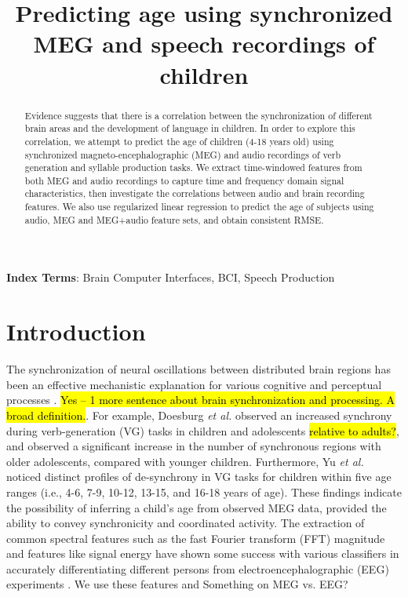 \documentclass[a4paper]{article}
\title{Predicting age using synchronized MEG and speech recordings of children}
\newcommand{\FR}[1]{{\small \textcolor{red}{\hl{#1}}}}
\begin{document}
\maketitle
% 
\begin{abstract}
Evidence suggests that there is a correlation between the synchronization of different brain areas and the development of language in children. In order to explore this correlation, we attempt to predict the age of children (4-18 years old) using synchronized magneto-encephalographic (MEG) and audio recordings of verb generation and syllable production tasks. We extract time-windowed features from both MEG and audio recordings to capture time and frequency domain signal characteristics, then investigate the correlations between audio and brain recording features. We also use regularized linear regression to predict the age of subjects using audio, MEG and MEG+audio feature sets, and obtain consistent RMSE.
\end{abstract}


\noindent\textbf{Index Terms}: Brain Computer Interfaces, BCI, Speech Production

\section{Introduction}

The synchronization of neural oscillations between distributed brain regions has been an effective mechanistic explanation for various cognitive and perceptual processes \cite{Fries2015,Nakasaki1989,NeuralSync}. \FR{Yes -- 1 more sentence about brain synchronization and processing. A broad definition.}. For example, Doesburg {\em et al.} \cite{Doesburg2016} observed an increased synchrony during verb-generation (VG) tasks in children and adolescents \FR{relative to adults?}, and observed a significant increase in the number of synchronous regions with older adolescents, compared with younger children. Furthermore, Yu {\em et al.} \cite{Yu2014} noticed distinct profiles of de-synchrony in VG tasks for children within five age ranges (i.e., 4-6, 7-9, 10-12, 13-15, and 16-18 years of age). These findings indicate the possibility of inferring a child's age from observed MEG data, provided the ability to convey synchronicity and coordinated activity. The extraction of common spectral features such as the fast Fourier transform (FFT) magnitude and features like signal energy have shown some success with various classifiers in accurately differentiating different persons from electroencephalographic (EEG) experiments \cite{Nguyen2012} \cite{Poulos2001}. We use these features and  Something on MEG vs. EEG?
\end{document}
